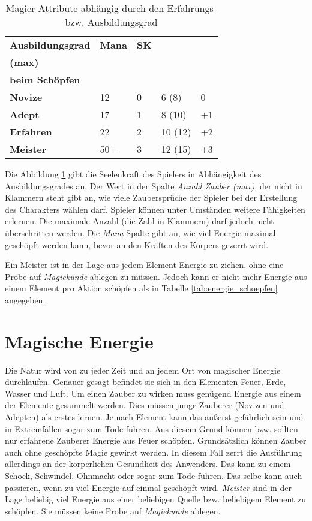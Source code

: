 \begin{table}[H]
\begin{center}
\begin{tabular}{|l|l|l|l|l|}
\hline
\textbf{Ausbildungsgrad} & \textbf{Mana} & \textbf{SK} & \brcell{\textbf{Anzahl Zauber}\\\textbf{(max)}} & \brcell{\textbf{Erleichterung}\\\textbf{beim Schöpfen}} \\ \hline
\textbf{Novize} & 12 & 0 & 6 (8) & 0 \\ \hline
\textbf{Adept} & 17 & 1 & 8 (10) & +1 \\ \hline
\textbf{Erfahren} & 22 & 2 & 10 (12) & +2 \\ \hline
\textbf{Meister} & 50+ & 3 & 12 (15) & +3 \\ \hline
\end{tabular}
\end{center}
\caption{Magier-Attribute abhängig durch den Erfahrungs- bzw. Ausbildungsgrad}
\label{tab:magier-attribute}
\end{table}

Die Abbildung \ref{tab:magier-attribute} gibt die Seelenkraft des Spielers in Abhängigkeit des Ausbildungsgrades an. Der Wert in der Spalte \textit{Anzahl Zauber (max)}, der nicht in Klammern steht gibt an, wie viele Zaubersprüche der Spieler bei der Erstellung des Charakters wählen darf. Spieler können unter Umständen weitere Fähigkeiten erlernen. Die maximale Anzahl (die Zahl in Klammern) darf jedoch nicht überschritten werden. Die \textit{Mana}-Spalte gibt an, wie viel Energie maximal geschöpft werden kann, bevor an den Kräften des Körpers gezerrt wird.

Ein Meister ist in der Lage aus jedem Element Energie zu ziehen, ohne eine Probe auf \textit{Magiekunde} ablegen zu müssen. Jedoch kann er nicht mehr Energie aus einem Element pro Aktion schöpfen als in Tabelle \ref{tab:energie_schoepfen} angegeben.

\section{Magische Energie}
Die Natur wird von zu jeder Zeit und an jedem Ort von magischer Energie durchlaufen. Genauer gesagt befindet sie sich in den Elementen Feuer, Erde, Wasser und Luft. Um einen Zauber zu wirken muss genügend Energie aus einem der Elemente gesammelt werden. Dies müssen junge Zauberer (Novizen und Adepten) als erstes lernen. Je nach Element kann das äußerst gefährlich sein und in Extremfällen sogar zum Tode führen. Aus diesem Grund können bzw. sollten nur erfahrene Zauberer Energie aus Feuer schöpfen. Grundsätzlich können Zauber auch ohne geschöpfte Magie gewirkt werden. In diesem Fall zerrt die Ausführung allerdings an der körperlichen Gesundheit des Anwenders. Das kann zu einem Schock, Schwindel, Ohnmacht oder sogar zum Tode führen. Das selbe kann auch passieren, wenn zu viel Energie auf einmal geschöpft wird. \textit{Meister} sind in der Lage beliebig viel Energie aus einer beliebigen Quelle bzw. beliebigem Element zu schöpfen. Sie müssen keine Probe auf \textit{Magiekunde} ablegen.

